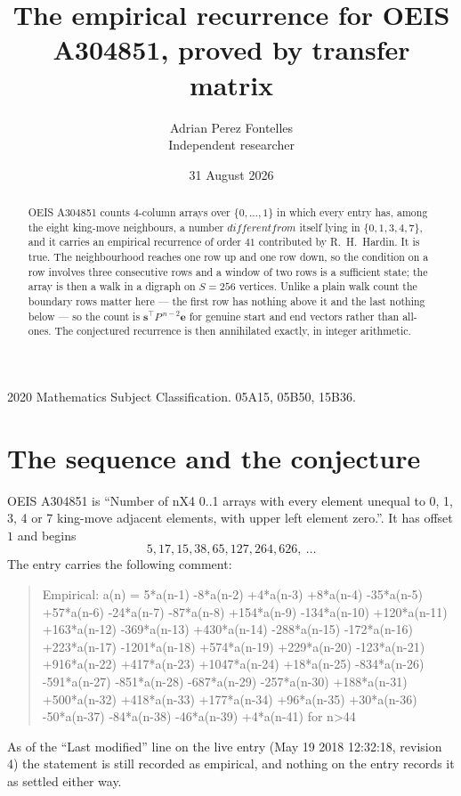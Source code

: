 \documentclass[11pt,a4paper]{article}
\title{The empirical recurrence for OEIS A304851, proved by transfer matrix}
\author{Adrian Perez Fontelles\\ \small Independent researcher}
\date{31 August 2026}
\theoremstyle{plain}
\theoremstyle{definition}
\begin{document}
\maketitle

\begin{abstract}
OEIS A304851 counts $4$-column arrays over $\{0,\dots,1\}$ in which every entry has,
among the eight king-move neighbours, a number $different from$ itself lying in $\{0,1,3,4,7\}$, and it carries an empirical
recurrence of order $41$ contributed by R.~H.~Hardin. It is true. The neighbourhood
reaches one row up and one row down, so the condition on a row involves three consecutive
rows and a window of two rows is a sufficient state; the array is then a walk in a digraph
on $S=256$ vertices. Unlike a plain walk count the boundary rows matter here --- the first
row has nothing above it and the last nothing below --- so the count is
$\mathbf{s}^{\!\top}P^{\,n-2}\mathbf{e}$ for genuine start and end vectors rather than
all-ones. The conjectured recurrence is then annihilated exactly, in integer arithmetic.
\end{abstract}

\noindent\small 2020 Mathematics Subject Classification. 05A15, 05B50, 15B36.\normalsize

\section{The sequence and the conjecture}

OEIS A304851 is ``Number of nX4 0..1 arrays with every element unequal to 0, 1, 3, 4 or 7 king-move adjacent elements, with upper left element zero.''. It has offset
$1$ and begins
\[
5, 17, 15, 38, 65, 127, 264, 626,\ \dots
\]
The entry carries the following comment:
\begin{quote}\small
Empirical: a(n) = 5*a(n-1) -8*a(n-2) +4*a(n-3) +8*a(n-4) -35*a(n-5) +57*a(n-6) -24*a(n-7) -87*a(n-8) +154*a(n-9) -134*a(n-10) +120*a(n-11) +163*a(n-12) -369*a(n-13) +430*a(n-14) -288*a(n-15) -172*a(n-16) +223*a(n-17) -1201*a(n-18) +574*a(n-19) +229*a(n-20) -123*a(n-21) +916*a(n-22) +417*a(n-23) +1047*a(n-24) +18*a(n-25) -834*a(n-26) -591*a(n-27) -851*a(n-28) -687*a(n-29) -257*a(n-30) +188*a(n-31) +500*a(n-32) +418*a(n-33) +177*a(n-34) +96*a(n-35) +30*a(n-36) -50*a(n-37) -84*a(n-38) -46*a(n-39) +4*a(n-41) for n>44
\end{quote}
As of the ``Last modified'' line on the live entry (May 19 2018 12:32:18, revision
4) the statement is still recorded as empirical, and nothing on the entry
records it as settled either way.
\end{document}
